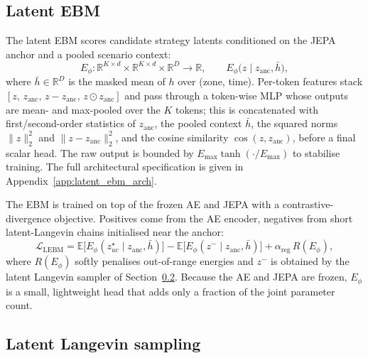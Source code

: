 \documentclass{article}
\begin{document}
\subsection{Latent EBM}
\label{sec:latent_ebm}

The latent EBM scores candidate strategy latents conditioned on the JEPA anchor and a pooled scenario context:
\begin{equation}
E_\phi: \mathbb{R}^{K\times d} \times \mathbb{R}^{K\times d} \times \mathbb{R}^{D} \longrightarrow \mathbb{R}, \qquad
E_\phi\!\bigl(z \mid z_{\mathrm{anc}}, \bar h\bigr),
\label{eq:lebm_signature}
\end{equation}
where $\bar h \in \mathbb{R}^D$ is the masked mean of $h$ over (zone, time). Per-token features stack $[z,\, z_{\mathrm{anc}},\, z - z_{\mathrm{anc}},\, z \odot z_{\mathrm{anc}}]$ and pass through a token-wise MLP whose outputs are mean- and max-pooled over the $K$ tokens; this is concatenated with first/second-order statistics of $z_{\mathrm{anc}}$, the pooled context $\bar h$, the squared norms $\|z\|_2^2$ and $\|z - z_{\mathrm{anc}}\|_2^2$, and the cosine similarity $\cos(z, z_{\mathrm{anc}})$, before a final scalar head. The raw output is bounded by $E_{\max} \tanh(\cdot / E_{\max})$ to stabilise training. The full architectural specification is given in Appendix~\ref{app:latent_ebm_arch}.

The EBM is trained on top of the frozen AE and JEPA with a contrastive-divergence objective. Positives come from the AE encoder, negatives from short latent-Langevin chains initialised near the anchor:
\begin{equation}
\mathcal{L}_{\mathrm{LEBM}} = \mathbb{E}\bigl[E_\phi(z^\star_{uc} \mid z_{\mathrm{anc}}, \bar h)\bigr] - \mathbb{E}\bigl[E_\phi(z^- \mid z_{\mathrm{anc}}, \bar h)\bigr] + \alpha_{\mathrm{reg}}\,R(E_\phi),
\label{eq:lebm_loss}
\end{equation}
where $R(E_\phi)$ softly penalises out-of-range energies and $z^-$ is obtained by the latent Langevin sampler of Section~\ref{sec:latent_langevin}. Because the AE and JEPA are frozen, $E_\phi$ is a small, lightweight head that adds only a fraction of the joint parameter count.

\subsection{Latent Langevin sampling}
\label{sec:latent_langevin}
\end{document}
